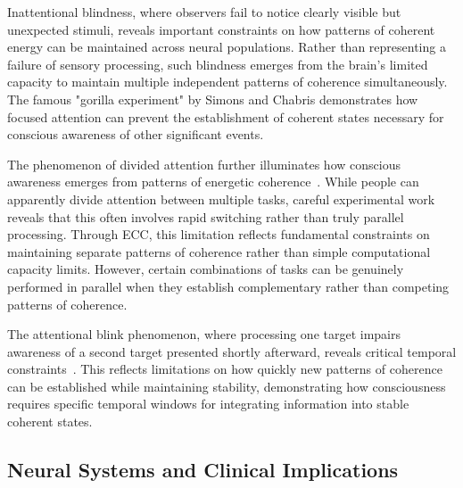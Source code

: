 Inattentional blindness, where observers fail to notice clearly visible but unexpected stimuli, reveals important constraints on how patterns of coherent energy can be maintained across neural populations. Rather than representing a failure of sensory processing, such blindness emerges from the brain's limited capacity to maintain multiple independent patterns of coherence simultaneously. The famous "gorilla experiment" by Simons and Chabris demonstrates how focused attention can prevent the establishment of coherent states necessary for conscious awareness of other significant events.

The phenomenon of divided attention further illuminates how conscious awareness emerges from patterns of energetic coherence~\cite{zheng2025unbearable}. While people can apparently divide attention between multiple tasks, careful experimental work reveals that this often involves rapid switching rather than truly parallel processing. Through ECC, this limitation reflects fundamental constraints on maintaining separate patterns of coherence rather than simple computational capacity limits. However, certain combinations of tasks can be genuinely performed in parallel when they establish complementary rather than competing patterns of coherence.

The attentional blink phenomenon, where processing one target impairs awareness of a second target presented shortly afterward, reveals critical temporal constraints~\cite{amil2024theta}. This reflects limitations on how quickly new patterns of coherence can be established while maintaining stability, demonstrating how consciousness requires specific temporal windows for integrating information into stable coherent states.

\subsection*{Neural Systems and Clinical Implications}

